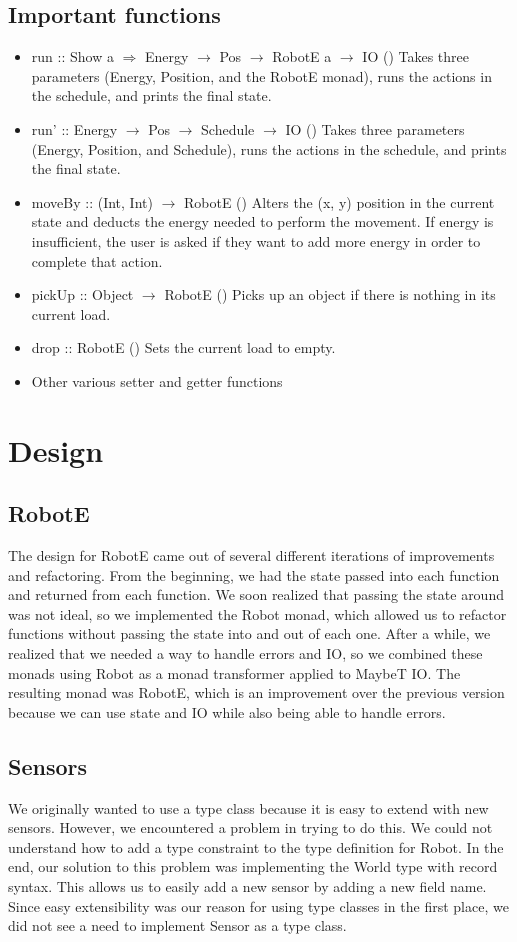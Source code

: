 \documentclass{sig-alternate-05-2015}
\begin{document}
\subsection{Important functions}
\begin{itemize}
\item \small run :: Show a $\Rightarrow$ Energy $\rightarrow$ Pos $\rightarrow$ RobotE a $\rightarrow$ IO ()
Takes three parameters (Energy, Position, and the RobotE monad), runs the actions in the schedule, and prints the final state.
\item run' :: Energy $\rightarrow$ Pos $\rightarrow$ Schedule $\rightarrow$ IO ()
Takes three parameters (Energy, Position, and Schedule), runs the actions in the schedule, and prints the final state.
\item moveBy :: (Int, Int) $\rightarrow$ RobotE ()
Alters the (x, y) position in the current state and deducts the energy needed to perform the movement. If energy is insufficient, the user is asked if they want to add more energy in order to complete that action.
\item pickUp :: Object $\rightarrow$ RobotE ()
Picks up an object if there is nothing in its current load.
\item drop :: RobotE ()
Sets the current load to empty.
\item Other various setter and getter functions
\end{itemize}

\section{Design}
\subsection{RobotE}
The design for RobotE came out of several different iterations of improvements and refactoring. From the beginning, we had the state passed into each function and returned from each function. We soon realized that passing the state around was not ideal, so we implemented the Robot monad, which allowed us to refactor functions without passing the state into and out of each one. After a while, we realized that we needed a way to handle errors and IO, so we combined these monads using Robot as a monad transformer applied to MaybeT IO. The resulting monad was RobotE, which is an improvement over the previous version because we can use state and IO while also being able to handle errors.
\subsection{Sensors}
We originally wanted to use a type class because it is easy to extend with new sensors. However, we encountered a problem in trying to do this. We could not understand how to add a type constraint to the type definition for Robot. In the end, our solution to this problem was implementing the World type with record syntax. This allows us to easily add a new sensor by adding a new field name. Since easy extensibility was our reason for using type classes in the first place, we did not see a need to implement Sensor as a type class.
\end{document}
